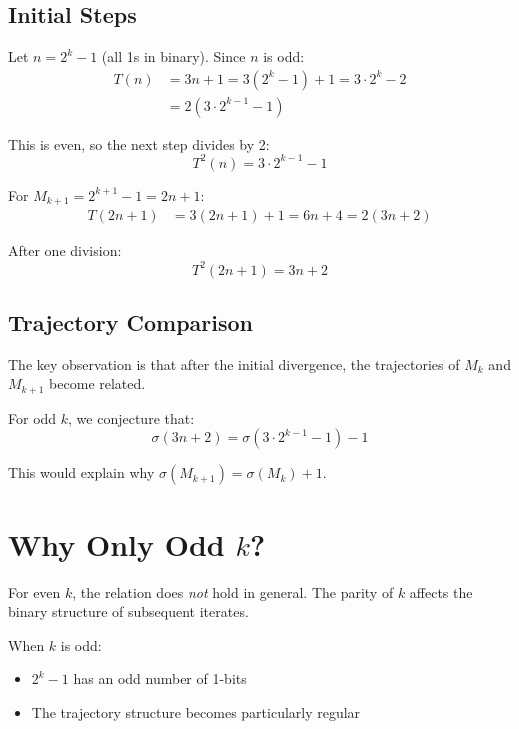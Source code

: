 \documentclass[twocolumn,prl,aps,superscriptaddress]{revtex4-2}
\begin{document}
\subsection{Initial Steps}

Let $n = 2^k - 1$ (all 1s in binary). Since $n$ is odd:
\begin{align}
T(n) &= 3n + 1 = 3(2^k - 1) + 1 = 3 \cdot 2^k - 2 \\
&= 2(3 \cdot 2^{k-1} - 1)
\end{align}

This is even, so the next step divides by 2:
\begin{equation}
T^2(n) = 3 \cdot 2^{k-1} - 1
\end{equation}

For $M_{k+1} = 2^{k+1} - 1 = 2n + 1$:
\begin{align}
T(2n+1) &= 3(2n+1) + 1 = 6n + 4 = 2(3n + 2)
\end{align}

After one division:
\begin{equation}
T^2(2n+1) = 3n + 2
\end{equation}

\subsection{Trajectory Comparison}

The key observation is that after the initial divergence, the trajectories 
of $M_k$ and $M_{k+1}$ become related.

For odd $k$, we conjecture that:
\begin{equation}
\sigma(3n+2) = \sigma(3 \cdot 2^{k-1} - 1) - 1
\end{equation}

This would explain why $\sigma(M_{k+1}) = \sigma(M_k) + 1$.

\section{Why Only Odd $k$?}

For even $k$, the relation does \emph{not} hold in general. The parity of $k$ 
affects the binary structure of subsequent iterates.

When $k$ is odd:
\begin{itemize}
\item $2^k - 1$ has an odd number of 1-bits
\item The trajectory structure becomes particularly regular
\end{itemize}
\end{document}
